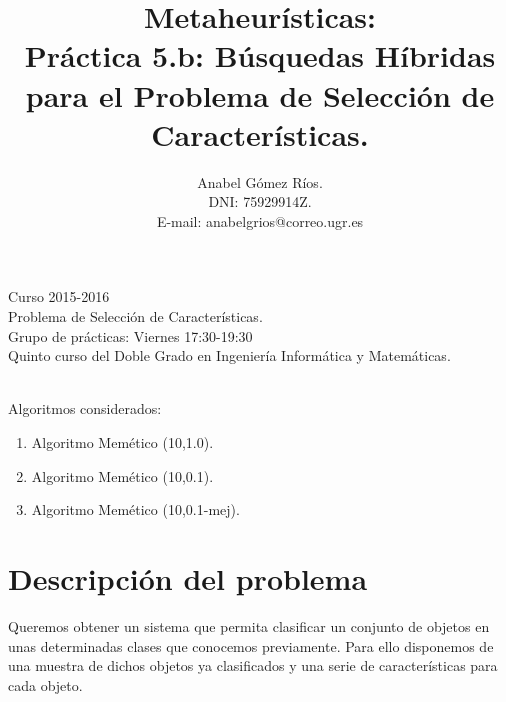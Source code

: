 \documentclass[12pt]{article}
\title{Metaheur\'isticas:\\
 Pr\'actica 5.b: Búsquedas Híbridas para el Problema de Selección de Características.}
\author{Anabel G\'omez R\'ios.\\
 DNI: 75929914Z.\\
 E-mail: anabelgrios@correo.ugr.es}
\begin{document}
\maketitle

\begin{center}
Curso 2015-2016\\

Problema de Selección de Características.\\ 

Grupo de prácticas: Viernes 17:30-19:30\\

Quinto curso del Doble Grado en Ingeniería Informática y Matemáticas.\\
\textit{ }\\
\end{center}

Algoritmos considerados:
\begin{enumerate}
\item Algoritmo Memético (10,1.0).
\item Algoritmo Memético (10,0.1).
\item Algoritmo Memético (10,0.1-mej).
\end{enumerate}

\newpage

\tableofcontents

\newpage

\section{Descripción del problema}
Queremos obtener un sistema que permita clasificar un conjunto de objetos en unas determinadas clases que conocemos previamente. Para ello disponemos de una muestra de dichos objetos ya clasificados y una serie de características para cada objeto.\\
\end{document}
